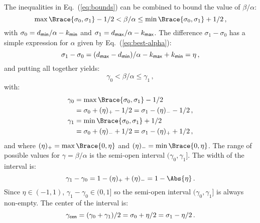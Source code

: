 \documentclass[]{article}
\begin{document}
The inequalities in Eq.~(\ref{eq:bounds}) can be combined to bound the value of
$\beta/\alpha$:
\begin{displaymath}
  \max\Brace{\sigma_0, \sigma_1} - 1/2
  < \beta/\alpha \le
  \min\Brace{\sigma_0, \sigma_1} + 1/2 \, ,
\end{displaymath}
with $\sigma_0 = d_{\mathsf{min}}/\alpha - k_{\mathsf{min}}$ and $\sigma_1 =
d_{\mathsf{max}}/\alpha - k_{\mathsf{max}}$.  The difference $\sigma_1 - \sigma_0$ has a
simple expression for $\alpha$ given by Eq.~(\ref{eq:best-alpha}):
\begin{displaymath}
  \sigma_1 - \sigma_0 =
  (d_{\mathsf{max}} - d_{\mathsf{min}})/\alpha - k_{\mathsf{max}} + k_{\mathsf{min}} = \eta \, ,
\end{displaymath}
and putting all together yields:
\begin{equation}
  \boxed{
    \gamma_0 < \beta/\alpha \le \gamma_1
  } \, ,
  \label{eq:beta-bounds}
\end{equation}
with:
\begin{align}
  \gamma_0 &= \max\Brace{\sigma_0, \sigma_1} - 1/2 \notag \\
  &= \sigma_0 + (\eta)_{+} - 1/2
   = \sigma_1 - (\eta)_{-} - 1/2 \, , \\
  \gamma_1 &= \min\Brace{\sigma_0, \sigma_1} + 1/2 \notag \\
  &= \sigma_0 + (\eta)_{-} + 1/2
   = \sigma_1 - (\eta)_{+} + 1/2 \, ,
\end{align}
and where $(\eta)_{+} = \max\Brace{0, \eta}$ and $(\eta)_{-} = \min\Brace{0,
\eta}$.  The range of possible values for $\gamma = \beta/\alpha$ is the
semi-open interval $(\gamma_0,\gamma_1]$.  The width of the interval is:
\begin{displaymath}
  \gamma_1 - \gamma_0 = 1 - (\eta)_{+} + (\eta)_{-} = 1 - \Abs{\eta} \, .
\end{displaymath}
Since $\eta \in (-1,1)$, $\gamma_1 - \gamma_0  \in (0,1]$ so the semi-open
interval $(\gamma_0,\gamma_1]$ is always non-empty.  The center of the interval
is:
\begin{displaymath}
  \gamma_{\mathsf{cen}} = (\gamma_0 + \gamma_1)/2 = \sigma_0 + \eta/2 = \sigma_1 - \eta/2 \, .
\end{displaymath}
\end{document}
